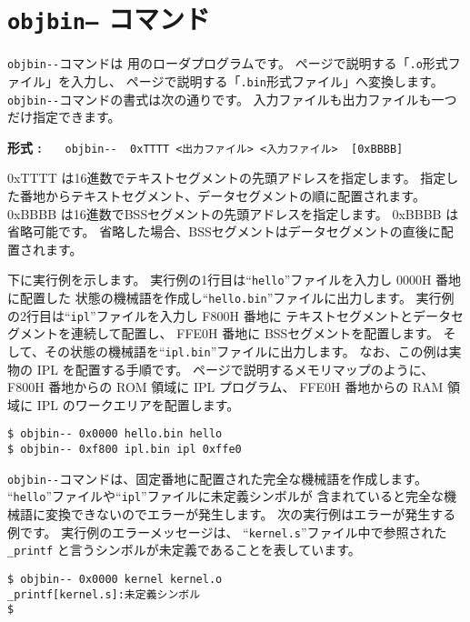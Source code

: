 \section{{\tt objbin--} コマンド}

\verb/objbin--/コマンドは \tac 用のローダプログラムです。
\pageref{app:oformat}ページで説明する「\verb/.o/形式ファイル」を入力し、
\pageref{app:bformat}ページで説明する「\verb/.bin/形式ファイル」へ変換します。
\verb/objbin--/コマンドの書式は次の通りです。
入力ファイルも出力ファイルも一つだけ指定できます。

\begin{flushleft}
{\bf 形式 : }~~~\verb/objbin--  0xTTTT <出力ファイル> <入力ファイル>  [0xBBBB]/
\end{flushleft}

0xTTTT は16進数でテキストセグメントの先頭アドレスを指定します。
指定した番地からテキストセグメント、データセグメントの順に配置されます。
0xBBBB は16進数でBSSセグメントの先頭アドレスを指定します。
0xBBBB は省略可能です。
省略した場合、BSSセグメントはデータセグメントの直後に配置されます。

下に実行例を示します。
実行例の1行目は``\verb/hello/''ファイルを入力し 0000H 番地に配置した
状態の機械語を作成し``\verb/hello.bin/''ファイルに出力します。
実行例の2行目は``\verb/ipl/''ファイルを入力し F800H 番地に
テキストセグメントとデータセグメントを連続して配置し、
FFE0H 番地に BSSセグメントを配置します。
そして、その状態の機械語を``\verb/ipl.bin/''ファイルに出力します。
なお、この例は実物の IPL を配置する手順です。
\pageref{app:memmap}ページで説明するメモリマップのように、
F800H 番地からの ROM 領域に IPL プログラム、
FFE0H 番地からの RAM 領域に IPL のワークエリアを配置します。

\begin{mylist}
\begin{verbatim}
$ objbin-- 0x0000 hello.bin hello
$ objbin-- 0xf800 ipl.bin ipl 0xffe0
\end{verbatim}
\end{mylist}

\verb/objbin--/コマンドは、固定番地に配置された完全な機械語を作成します。
``\verb/hello/''ファイルや``\verb/ipl/''ファイルに未定義シンボルが
含まれていると完全な機械語に変換できないのでエラーが発生します。
次の実行例はエラーが発生する例です。
実行例のエラーメッセージは、
``\verb/kernel.s/''ファイル中で参照された \verb/_printf/
と言うシンボルが未定義であることを表しています。

\begin{mylist}
\begin{verbatim}
$ objbin-- 0x0000 kernel kernel.o
_printf[kernel.s]:未定義シンボル
$
\end{verbatim}
\end{mylist}


